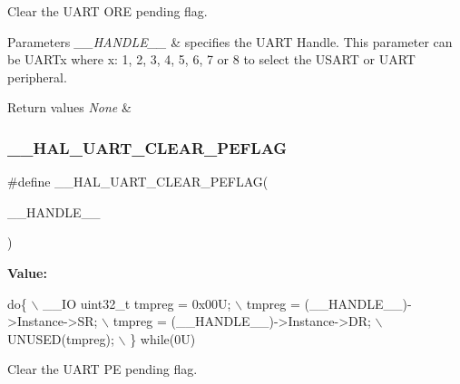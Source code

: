 Clear the U\+A\+RT O\+RE pending flag. 


\begin{DoxyParams}{Parameters}
{\em \+\_\+\+\_\+\+H\+A\+N\+D\+L\+E\+\_\+\+\_\+} & specifies the U\+A\+RT Handle. This parameter can be U\+A\+R\+Tx where x\+: 1, 2, 3, 4, 5, 6, 7 or 8 to select the U\+S\+A\+RT or U\+A\+RT peripheral. \\
\hline
\end{DoxyParams}

\begin{DoxyRetVals}{Return values}
{\em None} & \\
\hline
\end{DoxyRetVals}
\mbox{\label{group___u_a_r_t___exported___macros_gaba5e19c60e0f37341b1585a380b84d49}} 
\subsubsection{\texorpdfstring{\+\_\+\+\_\+\+H\+A\+L\+\_\+\+U\+A\+R\+T\+\_\+\+C\+L\+E\+A\+R\+\_\+\+P\+E\+F\+L\+AG}{\_\_HAL\_UART\_CLEAR\_PEFLAG}}
{\footnotesize\ttfamily \#define \+\_\+\+\_\+\+H\+A\+L\+\_\+\+U\+A\+R\+T\+\_\+\+C\+L\+E\+A\+R\+\_\+\+P\+E\+F\+L\+AG(\begin{DoxyParamCaption}\item[{}]{\+\_\+\+\_\+\+H\+A\+N\+D\+L\+E\+\_\+\+\_\+ }\end{DoxyParamCaption})}

{\bfseries Value\+:}
\begin{DoxyCode}
\textcolor{keywordflow}{do}\{                                           \(\backslash\)
    \_\_IO uint32\_t tmpreg = 0x00U;                \(\backslash\)
    tmpreg = (\_\_HANDLE\_\_)->Instance->SR;        \(\backslash\)
    tmpreg = (\_\_HANDLE\_\_)->Instance->DR;        \(\backslash\)
    UNUSED(tmpreg);                             \(\backslash\)
  \} \textcolor{keywordflow}{while}(0U)
\end{DoxyCode}


Clear the U\+A\+RT PE pending flag. 


